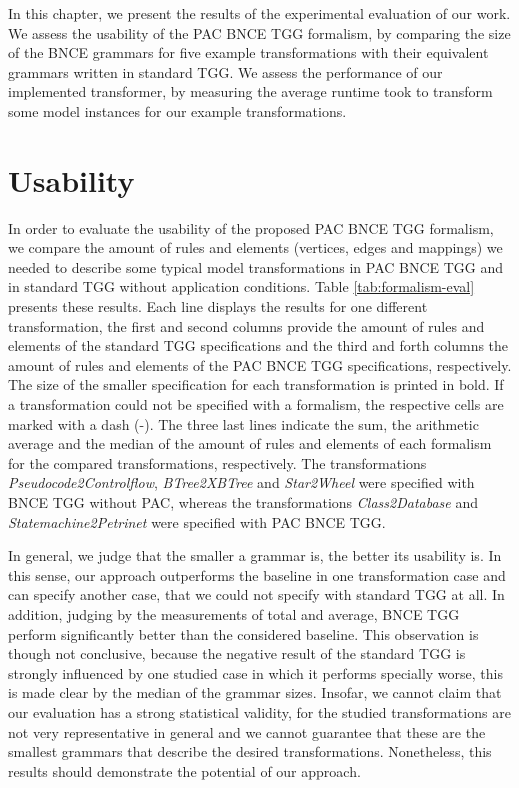 In this chapter, we present the results of the experimental evaluation of our work. We assess the usability of the PAC BNCE TGG formalism, by comparing the size of the BNCE grammars for five example transformations with their equivalent grammars written in standard TGG. We assess the performance of our implemented transformer, by measuring the average runtime took to transform some model instances for our example transformations.

\section{Usability}
\label{sec:eval-usability}
In order to evaluate the usability of the proposed PAC BNCE TGG formalism, we compare the amount of rules and elements (vertices, edges and mappings) we needed to describe some typical model transformations in PAC BNCE TGG and in standard TGG without application conditions. Table \ref{tab:formalism-eval} presents these results. Each line displays the results for one different transformation, the first and second columns provide the amount of rules and elements of the standard TGG specifications and the third and forth columns the amount of rules and elements of the PAC BNCE TGG specifications, respectively. The size of the smaller specification for each transformation is printed in bold. If a transformation could not be specified with a formalism, the respective cells are marked with a dash (-). The three last lines indicate the sum, the arithmetic average and the median of the amount of rules and elements of each formalism for the compared transformations, respectively. The transformations \emph{Pseudocode2Controlflow}, \emph{BTree2XBTree}	and \emph{Star2Wheel} were specified with BNCE TGG without PAC, whereas the transformations \emph{Class2Database} and \emph{Statemachine2Petrinet} were specified with PAC BNCE TGG.

In general, we judge that the smaller a grammar is, the better its usability is. In this sense, our approach outperforms the baseline in one transformation case and can specify another case, that we could not specify with standard TGG at all. In addition, judging by the measurements of total and average, BNCE TGG perform significantly better than the considered baseline. This observation is though not conclusive, because the negative result of the standard TGG is strongly influenced by one studied case in which it performs specially worse, this is made clear by the median of the grammar sizes. Insofar, we cannot claim that our evaluation has a strong statistical validity, for the studied transformations are not very representative in general and we cannot guarantee that these are the smallest grammars that describe the desired transformations. Nonetheless, this results should demonstrate the potential of our approach.

